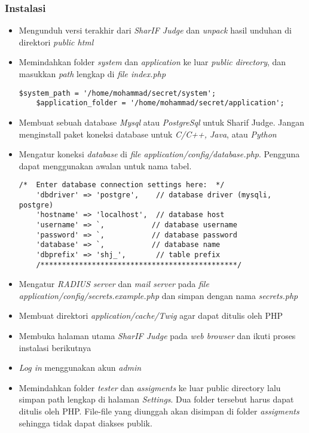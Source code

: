 \subsubsection{Instalasi}
\label{sec:instalasi}
\begin{itemize}
	\item Mengunduh versi terakhir dari \textit{SharIF Judge} dan \textit{unpack} hasil unduhan di direktori \textit{public html}
	\item Memindahkan folder \textit{system} dan \textit{application} ke luar \textit{public directory}, dan masukkan \textit{path} lengkap di \textit{file index.php}
	\begin{lstlisting}[basicstyle=\ttfamily, frame=single,
	columns=fullflexible, keepspaces=true, breaklines=true, label=ls:2]
	$system_path = '/home/mohammad/secret/system';
	$application_folder = '/home/mohammad/secret/application';
	\end{lstlisting}
	\item Membuat sebuah database \textit{Mysql} atau \textit{PostgreSql} untuk Sharif Judge. Jangan menginstall paket koneksi database untuk \textit{C/C++, Java}, atau \textit{Python}
	\item Mengatur koneksi \textit{database} di \textit{file application/config/database.php}. Pengguna dapat
	menggunakan awalan untuk nama tabel.
	\begin{lstlisting}[basicstyle=\ttfamily, frame=single,
	columns=fullflexible, keepspaces=true, breaklines=true, label=ls:3]
	/*  Enter database connection settings here:  */
	'dbdriver' => 'postgre',    // database driver (mysqli, postgre)
	'hostname' => 'localhost',  // database host
	'username' => `,           // database username
	'password' => `,           // database password
	'database' => `,           // database name
	'dbprefix' => 'shj_',       // table prefix
	/**********************************************/
	\end{lstlisting}
	\item Mengatur \textit{RADIUS server} dan \textit{mail server} pada \textit{file application/config/secrets.example.php} dan simpan dengan nama \textit{secrets.php}
	\item Membuat direktori \textit{application/cache/Twig} agar dapat ditulis oleh PHP
	\item Membuka halaman utama \textit{SharIF Judge} pada \textit{web browser} dan ikuti proses instalasi berikutnya
	\item \textit{Log in} menggunakan akun \textit{admin}
	\item Memindahkan folder \textit{tester} dan \textit{assigments} ke luar public directory lalu simpan path lengkap di halaman \textit{Settings}. Dua folder tersebut harus dapat ditulis oleh PHP. File-file yang diunggah
	akan disimpan di folder \textit{assigments} sehingga tidak dapat diakses publik.
\end{itemize}

